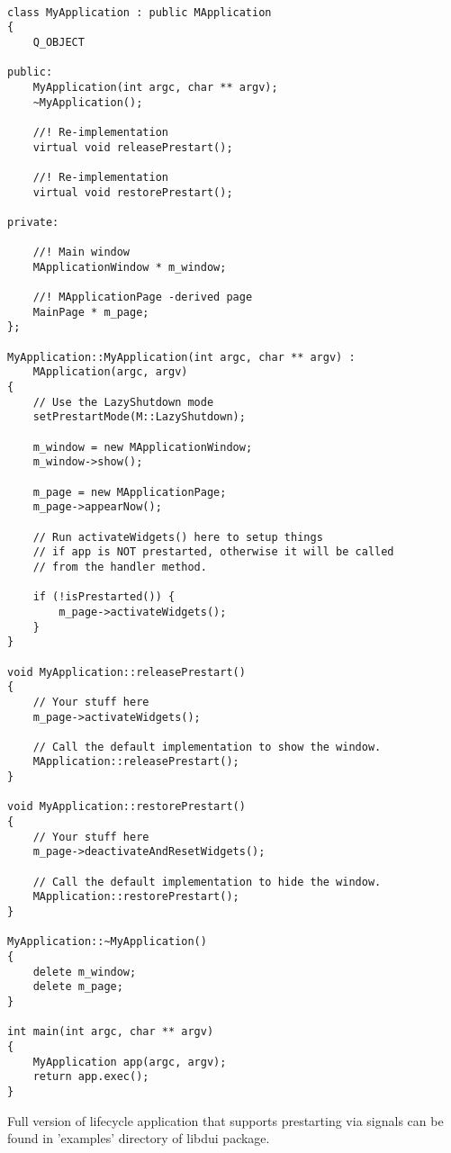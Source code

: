 \documentclass[a4paper]{article}
\begin{document}
\begin{verbatim}

class MyApplication : public MApplication
{
    Q_OBJECT

public:
    MyApplication(int argc, char ** argv);
    ~MyApplication();

    //! Re-implementation
    virtual void releasePrestart();

    //! Re-implementation
    virtual void restorePrestart();

private:

    //! Main window
    MApplicationWindow * m_window;

    //! MApplicationPage -derived page
    MainPage * m_page;
};

MyApplication::MyApplication(int argc, char ** argv) :
    MApplication(argc, argv)
{
    // Use the LazyShutdown mode
    setPrestartMode(M::LazyShutdown);

    m_window = new MApplicationWindow;
    m_window->show();

    m_page = new MApplicationPage;
    m_page->appearNow();

    // Run activateWidgets() here to setup things 
    // if app is NOT prestarted, otherwise it will be called
    // from the handler method.

    if (!isPrestarted()) {
        m_page->activateWidgets();
    }
}

void MyApplication::releasePrestart()
{
    // Your stuff here
    m_page->activateWidgets();

    // Call the default implementation to show the window.
    MApplication::releasePrestart();
}

void MyApplication::restorePrestart()
{
    // Your stuff here
    m_page->deactivateAndResetWidgets();

    // Call the default implementation to hide the window.
    MApplication::restorePrestart();
}

MyApplication::~MyApplication()
{
    delete m_window;
    delete m_page;
}

int main(int argc, char ** argv)
{
    MyApplication app(argc, argv);
    return app.exec();
}

\end{verbatim}

Full version of lifecycle application that supports prestarting via signals can be found in
'examples' directory of libdui package.
\end{document}
